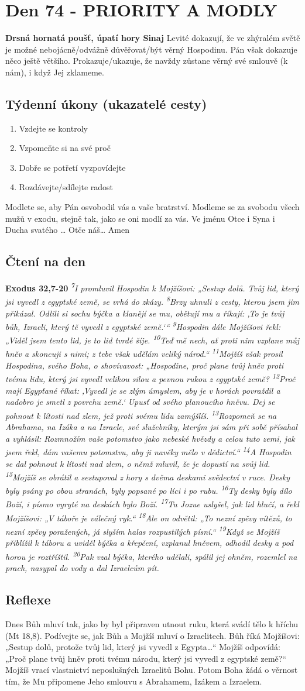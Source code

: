 \documentclass[11pt]{article}
\newcommand{\zacatekJedenactyTyden}{
\textbf{Drsná hornatá poušť, úpatí hory Sinaj} \newline 
Levité dokazují, že ve zhýralém světě je možné nebojácně/odvážně důvěřovat/být věrný Hospodinu. Pán však dokazuje něco ještě většího. Prokazuje/ukazuje, že navždy zůstane věrný své smlouvě (k nám), i když Jej zklameme.

\subsection*{Týdenní úkony (ukazatelé cesty)}
\begin{enumerate}
  \item Vzdejte se kontroly
  \item Vzpomeňte si na své proč
  \item Dobře se potřetí vyzpovídejte
  \item Rozdávejte/sdílejte radost
\end{enumerate}
Modlete se, aby Pán osvobodil vás a vaše bratrství. \newline
Modleme se za svobodu všech mužů v exodu, stejně tak, jako se oni modlí za vás.\newline
Ve jménu Otce i Syna i Ducha svatého …  Otče náš… Amen
}
\begin{document}
\newpage
\section{Den 74 - PRIORITY A MODLY}
\zacatekJedenactyTyden
\subsection*{Čtení na den}
\textbf{Exodus 32,7-20}
\newline
\textit{
\textsuperscript{7}I promluvil Hospodin k Mojžíšovi: „Sestup dolů. Tvůj lid, který jsi vyvedl z egyptské země, se vrhá do zkázy.
\textsuperscript{8}Brzy uhnuli z cesty, kterou jsem jim přikázal. Odlili si sochu býčka a klanějí se mu, obětují mu a říkají: ‚To je tvůj bůh, Izraeli, který tě vyvedl z egyptské země.‘“
\textsuperscript{9}Hospodin dále Mojžíšovi řekl: „Viděl jsem tento lid, je to lid tvrdé šíje.
\textsuperscript{10}Teď mě nech, ať proti nim vzplane můj hněv a skoncuji s nimi; z tebe však udělám veliký národ.“
\textsuperscript{11}Mojžíš však prosil Hospodina, svého Boha, o shovívavost: „Hospodine, proč plane tvůj hněv proti tvému lidu, který jsi vyvedl velikou silou a pevnou rukou z egyptské země?
\textsuperscript{12}Proč mají Egypťané říkat: ‚Vyvedl je se zlým úmyslem, aby je v horách povraždil a nadobro je smetl z povrchu země.‘ Upusť od svého planoucího hněvu. Dej se pohnout k lítosti nad zlem, jež proti svému lidu zamýšlíš.
\textsuperscript{13}Rozpomeň se na Abrahama, na Izáka a na Izraele, své služebníky, kterým jsi sám při sobě přísahal a vyhlásil: Rozmnožím vaše potomstvo jako nebeské hvězdy a celou tuto zemi, jak jsem řekl, dám vašemu potomstvu, aby ji navěky mělo v dědictví.“
\textsuperscript{14}A Hospodin se dal pohnout k lítosti nad zlem, o němž mluvil, že je dopustí na svůj lid.
\textsuperscript{15}Mojžíš se obrátil a sestupoval z hory s dvěma deskami svědectví v ruce. Desky byly psány po obou stranách, byly popsané po líci i po rubu.
\textsuperscript{16}Ty desky byly dílo Boží, i písmo vyryté na deskách bylo Boží.
\textsuperscript{17}Tu Jozue uslyšel, jak lid hlučí, a řekl Mojžíšovi: „V táboře je válečný ryk.“
\textsuperscript{18}Ale on odvětil: „To nezní zpěvy vítězů, to nezní zpěvy poražených, já slyším halas rozpustilých písní.“
\textsuperscript{19}Když se Mojžíš přiblížil k táboru a uviděl býčka a křepčení, vzplanul hněvem, odhodil desky a pod horou je roztříštil.
\textsuperscript{20}Pak vzal býčka, kterého udělali, spálil jej ohněm, rozemlel na prach, nasypal do vody a dal Izraelcům pít.
}

\subsection*{Reflexe}
Dnes Bůh mluví tak, jako by byl připraven utnout ruku, která svádí tělo k hříchu (Mt 18,8). Podívejte se, jak Bůh a Mojžíš mluví o
Izraelitech. Bůh říká Mojžíšovi: „Sestup dolů, protože tvůj lid, který jsi vyvedl z Egypta…“ Mojžíš odpovídá: „Proč plane tvůj
hněv proti tvému národu, který jsi vyvedl z egyptské země?“ Mojžíš vrací vlastnictví neposlušných Izraelitů Bohu. Potom Boha
žádá o věrnost tím, že Mu připomene Jeho smlouvu s Abrahamem, Izákem a Izraelem.
\end{document}
